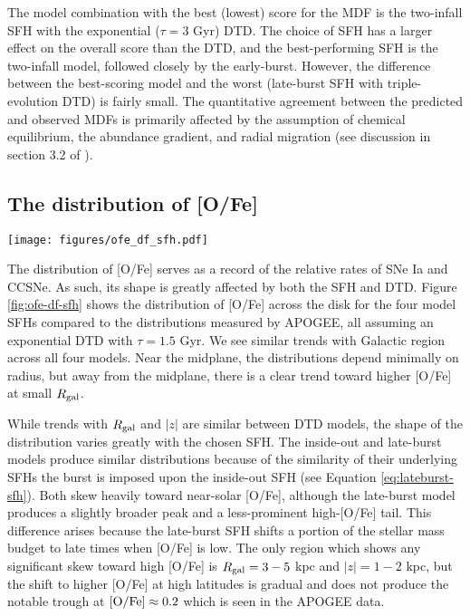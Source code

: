 \documentclass[twocolumn,twocolappendix,linenumbers,trackchanges]{aastex631}
\begin{document}
The model combination with the best (lowest) score for the MDF is the two-infall SFH with the exponential ($\tau=3$ Gyr) DTD. The choice of SFH has a larger effect on the overall score than the DTD, and the best-performing SFH is the two-infall model, followed closely by the early-burst. However, the difference between the best-scoring model and the worst (late-burst SFH with triple-evolution DTD) is fairly small. The quantitative agreement between the predicted and observed MDFs is primarily affected by the assumption of chemical equilibrium, the abundance gradient, and radial migration (see discussion in section 3.2 of ).

\subsection{The distribution of [O/Fe]}
\label{sec:ofe-df}

\begin{figure*}
    \centering
    \texttt{[image: figures/ofe\_df\_sfh.pdf]}
    \caption{Distributions of [O/Fe] from multi-zone models with different SFHs. All assume the exponential ($\tau=1.5$ Gyr) DTD. The format of each panel is the same as in Figure \ref{fig:feh-df-comparison}, except that all distributions are smoothed with a box-car width of 0.05 dex. Distributions from APOGEE DR17, binned and smoothed similarly, are presented in the right-most column for reference.}
    \label{fig:ofe-df-sfh}
\end{figure*}

The distribution of [O/Fe] serves as a record of the relative rates of SNe Ia and CCSNe. As such, its shape is greatly affected by both the SFH and DTD. Figure \ref{fig:ofe-df-sfh} shows the distribution of [O/Fe] across the disk for the four model SFHs compared to the distributions measured by APOGEE, all assuming an exponential DTD with $\tau=1.5$ Gyr. We see similar trends with Galactic region across all four models. Near the midplane, the distributions depend minimally on radius, but away from the midplane, there is a clear trend toward higher [O/Fe] at small $R_{\rm gal}$.

While trends with $R_{\rm gal}$ and $|z|$ are similar between DTD models, the shape of the distribution varies greatly with the chosen SFH. The inside-out and late-burst models produce similar distributions because of the similarity of their underlying SFHs \textemdash the burst is imposed upon the inside-out SFH (see Equation \ref{eq:lateburst-sfh}). Both skew heavily toward near-solar [O/Fe], although the late-burst model produces a slightly broader peak and a less-prominent high-[O/Fe] tail. This difference arises because the late-burst SFH shifts a portion of the stellar mass budget to late times when [O/Fe] is low. The only region which shows any significant skew toward high [O/Fe] is $R_{\rm gal}=3-5$ kpc and $|z|=1-2$ kpc, but the shift to higher [O/Fe] at high latitudes is gradual and does not produce the notable trough at ${\rm [O/Fe]}\approx0.2$ which is seen in the APOGEE data. 
\end{document}
